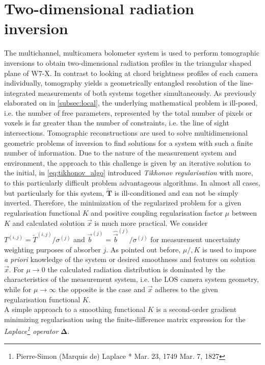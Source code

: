 %
\chapter{Two-dimensional radiation inversion}\label{chap:inversions}%
%
    The multichannel, multicamera bolometer system is used to perform tomographic inversions to obtain two-dimensional radiation profiles in the triangular shaped plane of W7-X. In contrast to looking at chord brightness profiles of each camera individually, tomography yields a geometrically entangled resolution of the line-integrated measurements of both systems together simultaneously. As previously elaborated on in \cref{subsec:local}, the underlying mathematical problem is ill-posed, i.e. the number of free parameters, represented by the total number of pixels or voxels is far greater than the number of constraints, i.e. the line of sight intersections. Tomographic reconstructions are used to solve multidimensional geometric problems of inversion to find solutions for a system with such a finite number of information. Due to the nature of the measurement system and environment, the approach to this challenge is given by an iterative solution to the initial, in \cref{eq:tikhonov_algo} introduced \textit{Tikhonov regularisation} with more, to this particularly difficult problem advantageous algorithms. In almost all cases, but particularly for this system, $\mathbf{\widetilde{T}}$ is ill-conditioned and can not be simply inverted. Therefore, the minimization of the regularized problem for a given regularisation functional $K$ and positive coupling regularisation factor $\mu$ between $K$ and calculated solution $\vec{x}$ is much more practical. We consider $T^{\left(i,j\right)}=\widetilde{T}^{\left(i,j\right)}/\sigma^{\left(j\right)}$ and $\vec{b}^{\left(j\right)}=\mathrel{\hat{\vec{b}}^{\left(j\right)}}/\sigma^{\left(j\right)}$ for measurement uncertainty weighting purposes of absorber $j$. As pointed out before, $\mu/,K$ is used to impose \textit{a priori} knowledge of the system or desired smoothness and features on solution $\vec{x}$. For $\mu\rightarrow0$ the calculated radiation distribution is dominated by the characteristics of the measurement system, i.e. the LOS camera system geometry, while for $\mu\rightarrow\infty$ the opposite is the case and $\vec{x}$ adheres to the given regularisation functional $K$.\\%
    A simple approach to a smoothing functional $K$ is a second-order gradient minimizing regularisation using the finite-difference matrix expression for the \textit{Laplace\footnote[1]{Pierre-Simon (Marquis de) Laplace * Mar. 23, 1749 \textdagger Mar. 7, 1827} operator} $\pmb{\Delta}$.%
